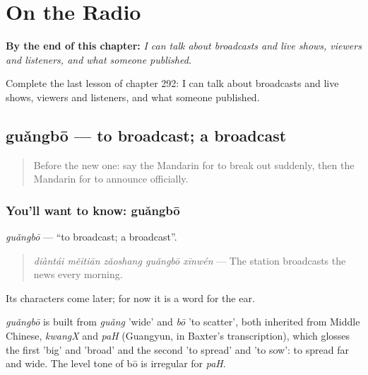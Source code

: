 
\chapter{On the Radio}
\label{ch:zh-on-the-radio}

\begin{chapteropening}
\textbf{By the end of this chapter:} \emph{I can talk about broadcasts and live shows, viewers and listeners, and what someone published.}

Complete the last lesson of chapter 292: I can talk about broadcasts and live shows, viewers and listeners, and what someone published.
\end{chapteropening}

\section[guǎngbō]{guǎngbō — to broadcast; a broadcast}

\label{lesson:ZH-C292-guangbo}



\begin{quote}
Before the new one: say the Mandarin for to break out suddenly, then the Mandarin for to announce officially.
\end{quote}

\subsection*{You'll want to know: guǎngbō}
\emph{guǎngbō} — \textquotedblleft{}to broadcast; a broadcast\textquotedblright{}.

\begin{quote}
\emph{diàntái měitiān zǎoshang guǎngbō xīnwén} — The station broadcasts the news every morning.
\end{quote}

Its characters come later; for now it is a word for the ear.

\begin{cousinweb}
\emph{guǎngbō} is built from \emph{guǎng} 'wide' and \emph{bō} 'to scatter', both inherited from Middle Chinese, \emph{kwangX} and \emph{paH} (Guangyun, in Baxter's transcription), which glosses the first 'big' and 'broad' and the second 'to spread' and 'to sow': to spread far and wide. The level tone of bō is irregular for \emph{paH}.
\end{cousinweb}

